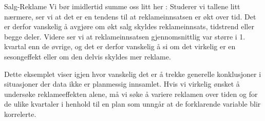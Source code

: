 \begin{eksempel}{Salg-Reklame}
Vi bør imidlertid summe oss litt her : Studerer vi tallene litt nærmere,
ser vi at det er en tendens til at reklameinnsatsen er økt over  tid.
Det er derfor vanskelig å avgjøre om økt salg skyldes reklameinnsats,
tidstrend eller begge deler. Videre ser vi at reklameinnsatsen gjennomsnittlig
var større i 1. kvartal enn de øvrige, og det er derfor vanskelig å
 si om det virkelig er en sesongeffekt eller om den delvis skyldes mer reklame.
\end{eksempel}

Dette eksemplet viser igjen hvor vanskelig det er å trekke generelle 
konklusjoner i situasjoner der data ikke er planmessig innsamlet. Hvis vi
virkelig ønsket å undersøke reklameeffekten alene, må vi
søke å variere reklamen over tiden og for de ulike kvartaler i 
henhold til en plan som unngår at de forklarende variable blir korrelerte.\\
 

\normalsize


